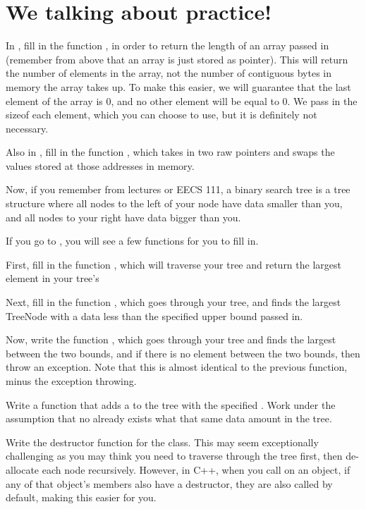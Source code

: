 \documentclass{tufte-handout}
\begin{document}
\section{We talking about practice!}


In , fill in the function , in order to return the length of an array passed in (remember from above that an array is just stored as pointer).
This will return the number of elements in the array, not the number of contiguous bytes in memory the array takes up.
To make this easier, we will guarantee that the last element of the array is 0, and no other element will be equal to 0.
We pass in the sizeof each element, which you can choose to use, but it is definitely not necessary.

Also in , fill in the function , which takes in two raw pointers and swaps the values stored at those addresses in memory.

Now, if you remember from lectures or EECS 111, a binary search tree is a tree structure where all nodes to the left of your node have data smaller than you, and all nodes to your right have data bigger than you.

If you go to , you will see a few functions for you to fill in.

First, fill in the function , which will traverse your tree and return the largest element in your tree's 

Next, fill in the function , which goes through your tree, and finds the largest TreeNode with a data less than the specified upper bound passed in.

Now, write the function , which goes through your tree and finds the largest  between the two bounds, and if there is no element between the two bounds, then throw an exception.
Note that this is almost identical to the previous function, minus the exception throwing.

Write a function  that adds a  to the tree with the specified .
Work under the assumption that no  already exists what that same data amount in the tree.

Write the destructor function for the  class.
This may seem exceptionally challenging as you may think you need to traverse through the tree first, then de-allocate each node recursively.
However, in C++, when you call  on an object, if any of that object's members also have a destructor, they are also called by default, making this easier for you.
\end{document}
